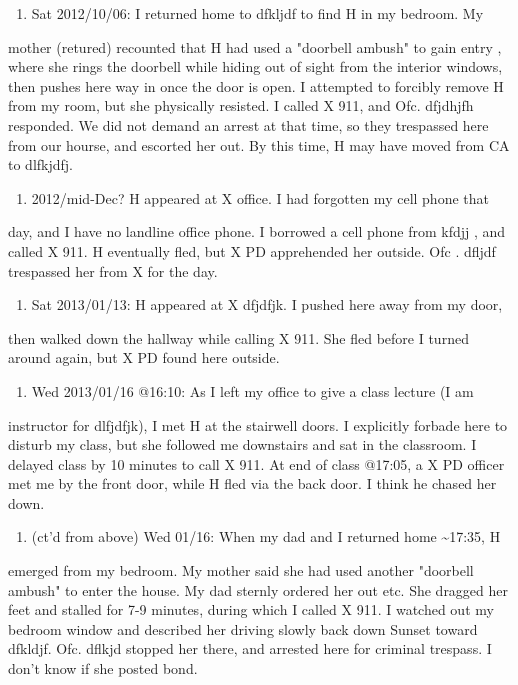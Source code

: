\documentclass[12pt]{book}
\begin{document}
\begin{enumerate}
\item Sat 2012/10/06: I returned home to dfkljdf to find H in my bedroom. My
\end{enumerate}
mother (retured) recounted that H had used a "doorbell ambush" to gain entry
, where she rings the doorbell while hiding out of sight from the interior 
windows, then pushes here way in once the door is open. I attempted to 
forcibly remove H from my room, but she physically resisted. I called X 911,
and Ofc. dfjdhjfh responded. We did not demand an arrest at that time, so 
they trespassed here from our hourse, and escorted her out. By this time, H 
may have moved from CA to dlfkjdfj. 

\begin{enumerate}
\item 2012/mid-Dec? H appeared at X office. I had forgotten my cell phone that
\end{enumerate}
day, and I have no landline office phone. I borrowed a cell phone from kfdjj
, and called X 911. H eventually fled, but X PD apprehended her outside. Ofc
. dfljdf trespassed her from X for the day. 

\begin{enumerate}
\item Sat 2013/01/13: H appeared at X dfjdfjk. I pushed here away from my door,
\end{enumerate}
then walked down the hallway while calling X 911. She fled before I turned 
around again, but X PD found here outside. 

\begin{enumerate}
\item Wed 2013/01/16 @16:10: As I left my office to give a class lecture (I am
\end{enumerate}
instructor for dlfjdfjk), I met H at the stairwell doors. I explicitly 
forbade here to disturb my class, but she followed me downstairs and sat in 
the classroom. I delayed class by 10 minutes to call X 911. At end of class 
@17:05, a X PD officer met me by the front door, while H fled via the back 
door. I think he chased her down. 

\begin{enumerate}
\item (ct'd from above) Wed 01/16: When my dad and I returned home \textasciitilde{}17:35, H
\end{enumerate}
emerged from my bedroom. My mother said she had used another "doorbell 
ambush" to enter the house. My dad sternly ordered her out etc. She dragged 
her feet and stalled for 7-9 minutes, during which I called X 911. I watched
out my bedroom window and described her driving slowly back down Sunset 
toward dfkldjf. Ofc. dflkjd stopped her there, and arrested here for 
criminal trespass. I don't know if she posted bond. 
\end{document}
